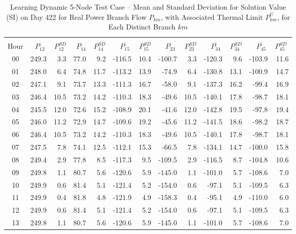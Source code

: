 \documentclass[12pt]{article}
\begin{document}
\begin{table}[h]
	\caption{Learning Dynamic 5-Node Test Case -- Mean and Standard Deviation for Solution Value (SI) on Day 422 for Real Power Branch Flow $P_{km}$, with Associated Thermal Limit $P_{km}^U$, for Each Distinct Branch $km$} 
	\label{tab: 5Node.Learning.BranchFlows}
\begin{minipage}{\textwidth}
	\centering
\begin{tabular}{crrrrrrrrrrrr} 
\hline\hline \\[0.1ex]
Hour & $\overline{P_{12}}~$ & $P_{12}^{SD}$ & $\overline{P_{14}}$ & $P_{14}^{SD}$ & $\overline{P_{15}}~$ & $P_{15}^{SD}$ &  $\overline{P_{23}}~$ & $P_{23}^{SD}$ & $\overline{P_{34}}~$ & $P_{34}^{SD}$ & $\overline{P_{45}}~$ & $P_{45}^{SD}~$\\
\hline
00	&	249.3	&	3.3	&	77.0	&	9.2	&	-116.5	&	10.4	&	-100.7	&	3.3	&	-120.3	&	9.6	&	-103.9	&	11.6	\\
01	&	248.0	&	6.4	&	74.8	&	11.7	&	-113.2	&	13.9	&	-74.9	&	6.4	&	-130.8	&	13.1	&	-100.9	&	14.7	\\
02	&	247.1	&	9.1	&	73.7	&	13.3	&	-111.3	&	16.7	&	-58.0	&	9.1	&	-137.3	&	16.2	&	-99.4	&	16.9	\\
03	&	246.4	&	10.5	&	73.2	&	14.2	&	-110.3	&	18.3	&	-49.6	&	10.5	&	-140.1	&	17.8	&	-98.7	&	18.1	\\
04	&	245.5	&	12.0	&	72.6	&	15.2	&	-108.9	&	20.1	&	-41.6	&	12.0	&	-142.8	&	19.5	&	-97.8	&	19.4	\\
05	&	246.0	&	11.2	&	72.9	&	14.7	&	-109.6	&	19.2	&	-45.6	&	11.2	&	-141.5	&	18.6	&	-98.2	&	18.7	\\
06	&	246.4	&	10.5	&	73.2	&	14.2	&	-110.3	&	18.3	&	-49.6	&	10.5	&	-140.1	&	17.8	&	-98.7	&	18.1	\\
07	&	247.5	&	7.8	&	74.1	&	12.5	&	-112.1	&	15.3	&	-66.5	&	7.8	&	-134.1	&	14.7	&	-100.0	&	15.8	\\
08	&	249.4	&	2.9	&	77.8	&	8.5	&	-117.3	&	9.5	&	-109.5	&	2.9	&	-116.5	&	8.7	&	-104.8	&	10.6	\\
09	&	249.8	&	1.1	&	80.7	&	5.6	&	-120.6	&	5.9	&	-145.0	&	1.1	&	-101.0	&	5.7	&	-108.6	&	7.0	\\
10	&	249.9	&	0.6	&	81.4	&	5.1	&	-121.4	&	5.2	&	-154.0	&	0.6	&	-97.1	&	5.1	&	-109.5	&	6.3	\\
11	&	249.9	&	0.4	&	81.8	&	4.8	&	-121.9	&	4.9	&	-158.3	&	0.4	&	-95.1	&	4.9	&	-110.0	&	6.0	\\
12	&	249.9	&	0.6	&	81.4	&	5.1	&	-121.4	&	5.2	&	-154.0	&	0.6	&	-97.1	&	5.1	&	-109.5	&	6.3	\\
13	&	249.8	&	1.1	&	80.7	&	5.6	&	-120.6	&	5.9	&	-145.0	&	1.1	&	-101.0	&	5.7	&	-108.6	&	7.0	\\

\end{tabular}
\end{minipage}
\end{table}
\end{document}
